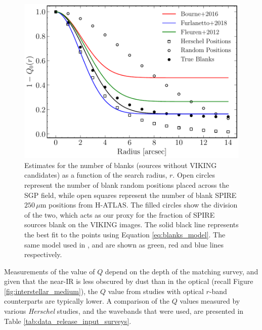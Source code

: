 \begin{figure}
    \centering
	\includegraphics[width=0.8\columnwidth]{Figures/Q_estimate.pdf}
	\caption[An estimate for the number of blank sources as a function of search radius]{Estimates for the number of blanks (sources without VIKING candidates) as a function of the search radius, $r$. Open circles represent the number of blank random positions placed across the SGP field, while open squares represent the number of blank SPIRE $250\,\mu$m positions from H-ATLAS. The filled circles show the division of the two, which acts as our proxy for the fraction of SPIRE sources blank on the VIKING images. The solid black line represents the best fit to the points using Equation \ref{eq:blanks_model}. The same model used in \citealt{Fleuren_2012}, \citealt{Bourne_2016} and \citealt{Furlanetto_2018} are shown as green, red and blue lines respectively.}
	\label{fig:Q_estimate}
\end{figure}

Measurements of the value of $Q$ depend on the depth of the matching survey, and given that the near-IR is less obscured by dust than in the optical (recall Figure \ref{fig:interstellar_medium}), the $Q$ value from studies with optical $r$-band counterparts are typically lower. A comparison of the $Q$ values measured by various \textit{Herschel} studies, and the wavebands that were used, are presented in Table \ref{tab:data_release_input_surveys}.

